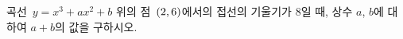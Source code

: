 곡선~$y=x^3+ax^2+b$ 위의 점~$(2{,}\mkern3mu\mathopen{}6)$에서의 접선의 기울기가 $8$일 때, 상수 $a$, $b$에 대하여 $a+b$의 값을 구하시오.
